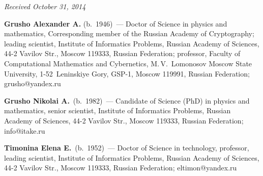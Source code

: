 \vspace*{-10pt}

\hfill{\small\textit{Received October 31, 2014}}

\pagebreak



    \Contr

\noindent
\textbf{Grusho Alexander A.} (b.\ 1946)~---
Doctor of Science in physics and mathematics,
Corresponding member of the Russian Academy
of Cryptography; leading scientist, Institute of Informatics Problems,
Russian Academy of
Sciences, 44-2 Vavilov Str., Moscow 119333, Russian Federation;
professor, Faculty of
Computational Mathematics and Cybernetics, M.\,V.~Lomonosov Moscow State University,
1-52~Leninskiye Gory, GSP-1, Moscow 119991, Russian Federation;
grusho@yandex.ru

\vspace*{3pt}

\noindent
\textbf{Grusho Nikolai A.}\ (b.\ 1982)~---
Candidate of Science (PhD) in physics and mathematics, senior scientist, Institute of Informatics
Problems, Russian Academy of Sciences, 44-2 Vavilov Str., Moscow 119333, Russian
Federation; info@itake.ru


\vspace*{3pt}

\noindent
\textbf{Timonina Elena E.}\ (b.\ 1952)~---
Doctor of Science in technology, professor, leading scientist, Institute of Informatics Problems,
Russian Academy of Sciences, 44-2 Vavilov Str., Moscow 119333, Russian Federation;
eltimon@yandex.ru

\label{end\stat}

\renewcommand{\bibname}{\protect\rm Литература}